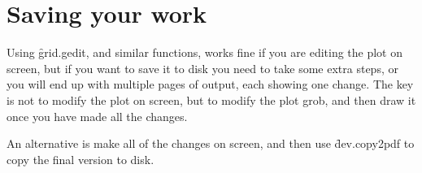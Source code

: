 % 
% 
% 
% 


\section{Saving your work} 
\label{sec:grid-save}

Using \f{grid.gedit}, and similar functions, works fine if you are editing the plot on screen, but if you want to save it to disk you need to take some extra steps, or you will end up with multiple pages of output, each showing one change.  The key is not to modify the plot on screen, but to modify the plot grob, and then draw it once you have made all the changes.  

% 
% 


An alternative is make all of the changes on screen, and then use \f{dev.copy2pdf} to copy the final version to disk.


